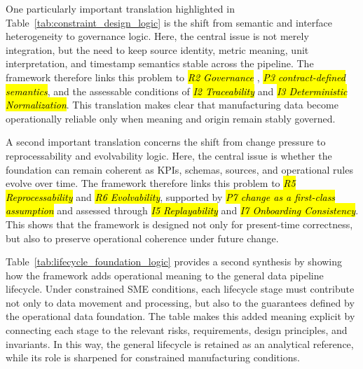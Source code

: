 \documentclass[systems,article,accept,pdftex,moreauthors]{Definitions/mdpi}
\begin{document}
One particularly important translation highlighted in Table~\ref{tab:constraint_design_logic} is the shift from semantic and interface heterogeneity to governance logic. Here, the central issue is not merely integration, but the need to keep source identity, metric meaning, unit interpretation, and timestamp semantics stable across the pipeline. The framework therefore links this problem to \emph{\hl{R2 Governance}%
}, \emph{\hl{P3 contract-defined semantics}}, and the assessable conditions of \emph{\hl{I2 Traceability}} and \emph{\hl{I3 Deterministic Normalization}}. This translation makes clear that manufacturing data become operationally reliable only when meaning and origin remain stably governed.

A second important translation concerns the shift from change pressure to reprocessability and evolvability logic. Here, the central issue is whether the foundation can remain coherent as KPIs, schemas, sources, and operational rules evolve over time. The framework therefore links this problem to \emph{\hl{R5 Reprocessability}} and \emph{\hl{R6 Evolvability}}, supported by \emph{\hl{P7 change as a first-class assumption}} and assessed through \emph{\hl{I5 Replayability}} and \emph{\hl{I7 Onboarding Consistency}}. This shows that the framework is designed not only for present-time correctness, but also to preserve operational coherence under future change.

Table~\ref{tab:lifecycle_foundation_logic} provides a second synthesis by showing how the framework adds operational meaning to the general data pipeline lifecycle. Under constrained SME conditions, each lifecycle stage must contribute not only to data movement and processing, but also to the guarantees defined by the operational data foundation. The table makes this added meaning explicit by connecting each stage to the relevant risks, requirements, design principles, and invariants. In this way, the general lifecycle is retained as an analytical reference, while its role is sharpened for constrained manufacturing conditions.
\end{document}
